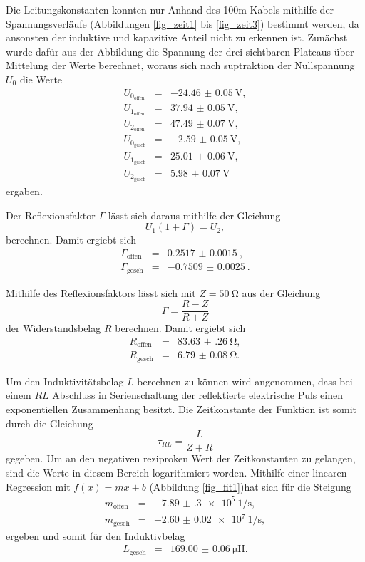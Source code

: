 Die Leitungskonstanten konnten nur Anhand des 100m Kabels mithilfe der Spannungsverläufe (Abbildungen \ref{fig_zeit1} bis \ref{fig_zeit3}) bestimmt werden, da ansonsten der induktive und kapazitive Anteil nicht zu erkennen ist.
Zunächst wurde dafür aus der Abbildung die Spannung der drei sichtbaren Plateaus über Mittelung der Werte berechnet, woraus sich nach suptraktion der Nullspannung $U_0$ die Werte
\begin{eqnarray*}
	U_{0_\text{offen}} &=& \SI{-24.46(5)}{\volt},\\
	U_{1_\text{offen}} &=& \SI{37.94(5)}{\volt},\\
	U_{2_\text{offen}} &=& \SI{47.49(7)}{\volt},\\
	U_{0_\text{gesch}} &=& \SI{-2.59(5)}{\volt},\\
	U_{1_\text{gesch}} &=& \SI{25.01(6)}{\volt},\\
	U_{2_\text{gesch}} &=& \SI{5.98(7)}{\volt}
\end{eqnarray*}
ergaben.

Der Reflexionsfaktor $\Gamma$ lässt sich daraus mithilfe der Gleichung
\begin{equation*}
	U_1 (1+\Gamma) = U_2,
\end{equation*}
 berechnen.
Damit ergiebt sich
\begin{eqnarray*}
	\Gamma_\text{offen} &=& \SI{0.2517(15)}{},\\
	\Gamma_\text{gesch} &=& \SI{-0.7509(25)}{}.
\end{eqnarray*}

Mithilfe des Reflexionsfaktors lässt sich mit $Z=\SI{50}{\ohm}$ aus der Gleichung
\begin{equation*}
	\Gamma = \frac{R-Z}{R+Z}
\end{equation*}
der Widerstandsbelag $R$ berechnen.
Damit ergiebt sich
\begin{eqnarray*}
	R_\text{offen} &=& \SI{83.63(26)}{\ohm},\\
	R_\text{gesch} &=& \SI{6.79(8)}{\ohm}.
\end{eqnarray*}

Um den Induktivitätsbelag $L$ berechnen zu können wird angenommen, dass bei einem $RL$ Abschluss in Serienschaltung der reflektierte elektrische Puls einen exponentiellen Zusammenhang besitzt.
Die Zeitkonstante der Funktion ist somit durch die Gleichung
\begin{equation*}
	\tau_{RL} = \frac{L}{Z+R}
\end{equation*}
gegeben.
Um an den negativen reziproken Wert der Zeitkonstanten zu gelangen, sind die Werte in diesem Bereich logarithmiert worden.
Mithilfe einer linearen Regression mit $f(x)=mx+b$ (Abbildung \ref{fig_fit1})hat sich für die Steigung
\begin{eqnarray*}
	m_\text{offen} &=& \SI{-7.89(30)e5}{1\per\second},\\
	m_\text{gesch} &=& \SI{-2.60(2)e7}{1\per\second},
\end{eqnarray*}
ergeben und somit für den Induktivbelag
\begin{eqnarray*}
	L_\text{gesch} &=& \SI{169.00(6)}{\micro\henry}.
\end{eqnarray*}

